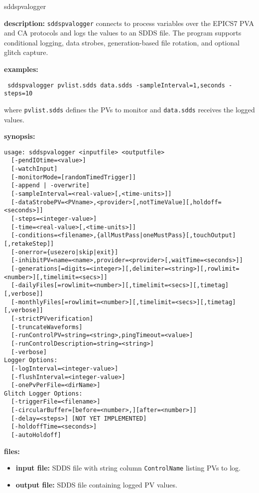 \begin{sddsprog}{sddspvalogger}
\item \textbf{description:}
\verb+sddspvalogger+ connects to process variables over the EPICS7 PVA and CA protocols and logs the values to an SDDS file. The program supports conditional logging, data strobes, generation-based file rotation, and optional glitch capture.
\item \textbf{examples:}
\begin{flushleft}{\tt
sddspvalogger pvlist.sdds data.sdds -sampleInterval=1,seconds -steps=10\\
}\end{flushleft}
where {\tt pvlist.sdds} defines the PVs to monitor and {\tt data.sdds} receives the logged values.
\item \textbf{synopsis:}
\begin{verbatim}
usage: sddspvalogger <inputfile> <outputfile>
  [-pendIOtime=<value>]
  [-watchInput]
  [-monitorMode=[randomTimedTrigger]]
  [-append | -overwrite]
  [-sampleInterval=<real-value>[,<time-units>]]
  [-dataStrobePV=<PVname>,<provider>[,notTimeValue][,holdoff=<seconds>]]
  [-steps=<integer-value>]
  [-time=<real-value>[,<time-units>]]
  [-conditions=<filename>,{allMustPass|oneMustPass}[,touchOutput][,retakeStep]]
  [-onerror={usezero|skip|exit}]
  [-inhibitPV=name=<name>,provider=<provider>[,waitTime=<seconds>]]
  [-generations[=digits=<integer>][,delimiter=<string>][,rowlimit=<number>][,timelimit=<secs>]]
  [-dailyFiles[=rowlimit=<number>][,timelimit=<secs>][,timetag][,verbose]]
  [-monthlyFiles[=rowlimit=<number>][,timelimit=<secs>][,timetag][,verbose]]
  [-strictPVverification]
  [-truncateWaveforms]
  [-runControlPV=string=<string>,pingTimeout=<value>]
  [-runControlDescription=string=<string>]
  [-verbose]
Logger Options:
  [-logInterval=<integer-value>]
  [-flushInterval=<integer-value>]
  [-onePvPerFile=<dirName>]
Glitch Logger Options:
  [-triggerFile=<filename>]
  [-circularBuffer=[before=<number>,][after=<number>]]
  [-delay=<steps>] [NOT YET IMPLEMENTED]
  [-holdoffTime=<seconds>]
  [-autoHoldoff]
\end{verbatim}
\item \textbf{files:}
\begin{itemize}
  \item \textbf{input file:} SDDS file with string column \verb|ControlName| listing PVs to log.
  \item \textbf{output file:} SDDS file containing logged PV values.
\end{itemize}


\end{sddsprog}
